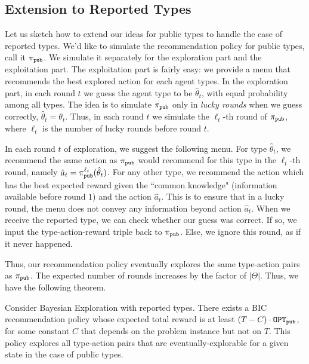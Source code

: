 
\subsection{Extension to Reported Types}
\label{sec:reported}

\newcommand{\pipub}{\pi_{\term{pub}}}

Let us sketch how to extend our ideas for public types to handle the case of reported types. We'd like to simulate the recommendation policy for public types, call it $\pipub$. We simulate it separately for the exploration part and the exploitation part. The exploitation part is fairly easy: we provide a menu that recommends the best explored action for each agent types. In the exploration part, in each round $t$ we guess the agent type to be $\hat{\theta}_t$, with equal probability among all types. 
The idea is to simulate $\pipub$ only in \emph{lucky rounds} when we guess correctly, \ie $\hat{\theta}_t=\theta_t$. Thus, 
in each round $t$ we simulate the $\ell_t$-th round of $\pipub$, where $\ell_t$ is the number of lucky rounds before round $t$.

In each round $t$ of exploration, we suggest the following menu. For type $\hat{\theta}_t$, we recommend the same action as $\pipub$ would recommend for this type in the $\ell_t$-th round, namely 
    $\hat{a}_t = \pipub^{\ell_t}(\hat{\theta}_t)$.
For any other type, we recommend the action which has the best expected reward given the ``common knowledge" (information available before round $1$) and the action $\hat{a}_t$. This is to ensure that in a lucky round, the menu does not convey any information beyond action  $\hat{a}_t$. When we receive the reported type, we can check whether our guess was correct. If so, we input the type-action-reward triple back to $\pipub$. Else, we ignore this round, as if it never happened.

Thus, our recommendation policy eventually explores the same type-action pairs as $\pipub$. The expected number of rounds increases by the factor of $|\varTheta|$. Thus, we have the following theorem.

\begin{theorem}
\label{thm:reported}
Consider Bayesian Exploration with reported types.
There exists a BIC recommendation policy whose expected total reward is at least $\left(T - C \right) \cdot \mathtt{OPT}_{\mathtt{pub}}$, 
for some constant $C$ that depends on the problem instance but not on $T$.
This policy explores all type-action pairs that are eventually-explorable for a given state in the case of public types.
\end{theorem}

